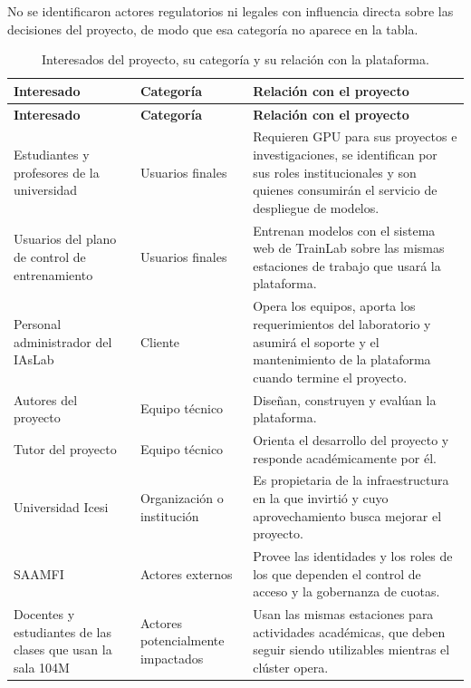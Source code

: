 No se identificaron actores regulatorios ni legales con influencia directa sobre las decisiones del proyecto, de modo que esa categoría no aparece en la tabla.

\begin{xltabular}{\textwidth}{>{\raggedright\arraybackslash}p{0.27\textwidth} >{\raggedright\arraybackslash}p{0.2\textwidth} X}
  \caption{Interesados del proyecto, su categoría y su relación con la plataforma.}
  \label{tab:interesados} \\
  \toprule
  \textbf{Interesado} & \textbf{Categoría} & \textbf{Relación con el proyecto} \\
  \midrule
  \endfirsthead
  \toprule
  \textbf{Interesado} & \textbf{Categoría} & \textbf{Relación con el proyecto} \\
  \midrule
  \endhead
  \bottomrule
  \endfoot
  Estudiantes y profesores de la universidad & Usuarios finales & Requieren GPU para sus proyectos e investigaciones, se identifican por sus roles institucionales y son quienes consumirán el servicio de despliegue de modelos. \\
  \addlinespace
  Usuarios del plano de control de entrenamiento & Usuarios finales & Entrenan modelos con el sistema web de TrainLab sobre las mismas estaciones de trabajo que usará la plataforma. \\
  \addlinespace
  Personal administrador del IAsLab & Cliente & Opera los equipos, aporta los requerimientos del laboratorio y asumirá el soporte y el mantenimiento de la plataforma cuando termine el proyecto. \\
  \addlinespace
  Autores del proyecto & Equipo técnico & Diseñan, construyen y evalúan la plataforma. \\
  \addlinespace
  Tutor del proyecto & Equipo técnico & Orienta el desarrollo del proyecto y responde académicamente por él. \\
  \addlinespace
  Universidad Icesi & Organización o institución & Es propietaria de la infraestructura en la que invirtió y cuyo aprovechamiento busca mejorar el proyecto. \\
  \addlinespace
  SAAMFI & Actores externos & Provee las identidades y los roles de los que dependen el control de acceso y la gobernanza de cuotas. \\
  \addlinespace
  Docentes y estudiantes de las clases que usan la sala 104M & Actores potencialmente impactados & Usan las mismas estaciones para actividades académicas, que deben seguir siendo utilizables mientras el clúster opera. \\
\end{xltabular}

